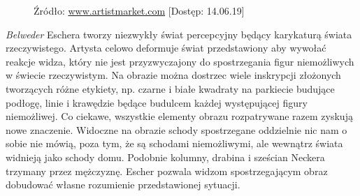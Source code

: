 \documentclass[licencjacka]{kdypl}
\begin{document}
\begin{figure}[H]
    \centering
    \qquad
    \caption{Źródło: \url{www.artistmarket.com} [Dostęp: 14.06.19]}
    \end{figure}


\textit{Belweder} Eschera tworzy niezwykły świat percepcyjny będący karykaturą świata rzeczywistego. Artysta celowo deformuje świat przedstawiony aby wywołać reakcje widza, który nie jest przyzwyczajony do spostrzegania figur niemożliwych w świecie rzeczywistym. Na obrazie można dostrzec  wiele inskrypcji złożonych tworzących różne etykiety, np. czarne i białe kwadraty na parkiecie budujące podłogę, linie i krawędzie będące budulcem każdej występującej figury niemożliwej. Co ciekawe, wszystkie elementy obrazu rozpatrywane razem zyskują nowe znaczenie. Widoczne na obrazie schody spostrzegane oddzielnie nic nam o sobie nie mówią, poza tym, że są schodami niemożliwymi, ale wewnątrz świata widnieją jako schody domu. Podobnie kolumny, drabina i sześcian Neckera trzymany przez mężczyznę. Escher pozwala widzom spostrzegającym obraz  dobudować własne rozumienie przedstawionej sytuacji.   
\end{document}
